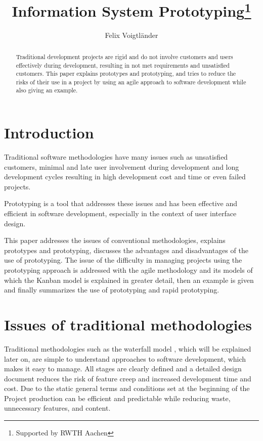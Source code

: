 \documentclass[runningheads]{llncs}
\begin{document}
%
\title{Information System Prototyping\thanks{Supported by RWTH Aachen}}
%
%
\author{Felix Voigtländer}
%
%
%
\maketitle              %
%
\begin{abstract}
Traditional development projects are rigid and do not involve customers and users
effectively during development, resulting in not met requirements and unsatisfied customers.
This paper explains prototypes and prototyping, and tries to reduce the risks of 
their use in a project by using an agile approach to software development while also giving an example.

\end{abstract}
%
%
%
\section{Introduction}
Traditional software methodologies have many issues such as unsatisfied customers,
minimal and late user involvement during development and long development cycles resulting
in high development cost and time or even failed projects.

Prototyping is a tool that addresses these issues and has been effective and efficient
in software development, especially in the context of user interface design.

This paper addresses the issues of conventional methodologies, explains prototypes and prototyping,
discusses the advantages and disadvantages of the use of prototyping. 
The issue of the difficulty in managing projects using the prototyping approach is addressed with the agile methodology
and its models of which the Kanban model is explained in greater detail,
then an example is given and finally summarizes the use of prototyping and rapid prototyping.

\section{Issues of traditional methodologies}
Traditional methodologies such as the waterfall model \cite{ref_waterfall}, which 
will be explained later on, are simple to understand approaches to software development, 
which makes it easy to manage. All stages are clearly defined and a detailed design document
reduces the risk of feature creep and increased development time and cost.
Due to the static general terms and conditions set at the beginning of the Project
production can be efficient and predictable while reducing waste, unnecessary features,
and content.
\end{document}
